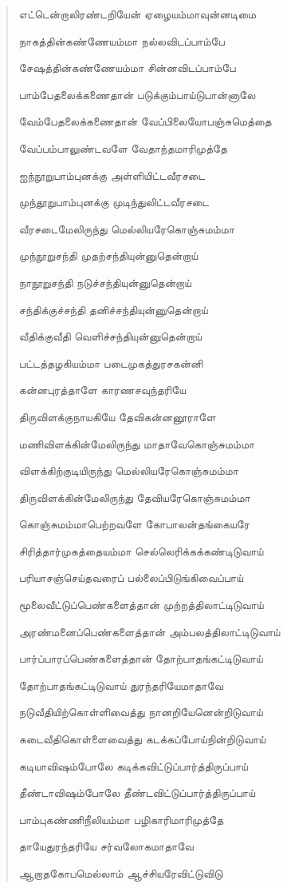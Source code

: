 \documentclass{article}
\begin{document}
\begin{quotation}
{எட்டென்றாலிரண்டறியேன் ஏழையம்மாவுன்னடிமை

நாகத்தின்கண்ணேயம்மா நல்லவிடப்பாம்பே

சேஷத்தின்கண்ணேயம்மா சின்னவிடப்பாம்பே

பாம்பேதலைக்கணைதான் படுக்கும்பாய்டுபான்னாலே

வேம்பேதலைக்கணைதான் வேப்பிலையோபஞ்சுமெத்தை

வேப்பம்பாலுண்டவளே வேதாந்தமாரிமுத்தே

ஐந்நூறுபாம்புனக்கு அள்ளியிட்டவீரசடை

முந்தூறுபாம்புனக்கு முடிந்துலிட்டவீரசடை

வீரசடைமேலிருந்து மெல்லியரேகொஞ்சுமம்மா

முந்நூறுசந்தி முதற்சந்தியுன்னுதென்றாய்

நாநூறுசந்தி நடுச்சந்தியுன்னுதென்றாய்

சந்திக்குச்சந்தி தனிச்சந்தியுன்னுதென்றாய்

வீதிக்குவீதி வெளிச்சந்தியுன்னுதென்றாய்

பட்டத்தழகியம்மா படைமுகத்துரசகன்னி

கன்னபுரத்தாளே காரணசவுந்தரியே

திருவிளக்குநாயகியே தேவிகன்னனூராளே

மணிவிளக்கின்மேலிருந்து மாதாவேகொஞ்சுமம்மா

விளக்கிற்குடியிருந்து மெல்லியரேகொஞ்சுமம்மா

திருவிளக்கின்மேலிருந்து தேவியரேகொஞ்சுமம்மா

கொஞ்சுமம்மாபெற்றவளே கோபாலன்தங்கையரே

சிரித்தார்முகத்தையம்மா செல்லெரிக்கக்கண்டிடுவாய்

பரியாசஞ்செய்தவரைப் பல்லைப்பிடுங்கிவைப்பாய்

மூலைவீட்டுப்பெண்களைத்தான் முற்றத்திலாட்டிடுவாய்

அரண்மனைப்பெண்களைத்தான் அம்பலத்திலாட்டிடுவாய்

பார்ப்பாரப்பெண்களைத்தான் தோற்பாதங்கட்டிடுவாய்

தோற்பாதங்கட்டிடுவாய் துரந்தரியேமாதாவே

நடுவீதியிற்கொள்ளிவைத்து நானறியேனென்றிடுவாய்

கடைவீதிகொள்ளைவைத்து கடக்கப்போய்நின்றிடுவாய்

கடியாவிஷம்போலே கடிக்கவிட்டுப்பார்த்திருப்பாய்

தீண்டாவிஷம்போலே தீண்டவிட்டுப்பார்த்திருப்பாய்

பாம்புகண்ணிநீலியம்மா பழிகாரிமாரிமுத்தே

தாயேதுரந்தரியே சர்வலோகமாதாவே

ஆறாதகோபமெல்லாம் ஆச்சியரேவிட்டுவிடு

}
\end{quotation}
\end{document}
